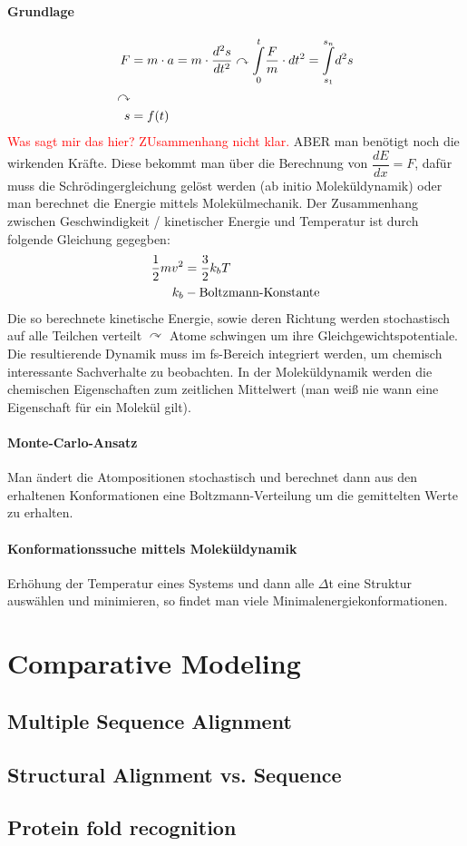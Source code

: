 \documentclass[12pt,a4paper,oneside,normalheadings,abstracton,liststotoc,bibtotoc,titlepage,pdftex]{scrartcl}
\begin{document}
\paragraph{Grundlage}
\begin{align}
F &= m \cdot a = m \cdot \dfrac{d^2s}{dt^2} \curvearrowright \overset{t}{\underset{0}{\int}} \dfrac{F}{m} \cdot dt^2 = \overset{s_n}{\underset{s_1}{\int}} d^2s\\
\notag \curvearrowright \\
s &= f(t)
\end{align}
\textcolor{red}{Was sagt mir das hier? ZUsammenhang nicht klar.}
ABER man benötigt noch die wirkenden Kräfte. Diese bekommt man über die Berechnung von $\dfrac{dE}{dx}=F$, dafür muss die Schrödingergleichung gelöst werden (ab initio Moleküldynamik) oder man berechnet die Energie mittels Molekülmechanik. Der Zusammenhang zwischen Geschwindigkeit / kinetischer Energie und Temperatur ist durch folgende Gleichung gegegben:
\begin{align}
\dfrac{1}{2} m v^2 &= \dfrac{3}{2} k_b T\\
\notag k_b &- \text{Boltzmann-Konstante}
\end{align}
Die so berechnete kinetische Energie, sowie deren Richtung werden stochastisch auf alle Teilchen verteilt $\curvearrowright$ Atome schwingen um ihre Gleichgewichtspotentiale. Die resultierende Dynamik muss im fs-Bereich integriert werden, um chemisch interessante Sachverhalte zu beobachten. In der Moleküldynamik werden die chemischen Eigenschaften zum zeitlichen Mittelwert (man weiß nie wann eine Eigenschaft für ein Molekül gilt).
\paragraph{Monte-Carlo-Ansatz}
Man ändert die Atompositionen stochastisch und berechnet dann aus den erhaltenen Konformationen eine Boltzmann-Verteilung um die gemittelten Werte zu erhalten.
\paragraph{Konformationssuche mittels Moleküldynamik} 
Erhöhung der Temperatur eines Systems und dann alle $\Delta$t eine Struktur auswählen und minimieren, so findet man viele Minimalenergiekonformationen.


\section{Comparative Modeling}
\subsection{Multiple Sequence Alignment}
\subsection{Structural Alignment vs. Sequence}

\subsection{Protein fold recognition}
\end{document}
